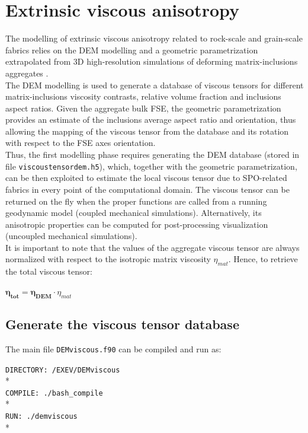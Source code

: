 \newpage

\section{Extrinsic viscous anisotropy}
The modelling of extrinsic viscous anisotropy related to rock-scale and grain-scale fabrics relies on the DEM modelling and a geometric parametrization extrapolated from 3D high-resolution simulations of deforming matrix-inclusions aggregates \citep{demontserrat2021}. \\
The DEM modelling is used to generate a database of viscous tensors for different matrix-inclusions viscosity contrasts, relative volume fraction and inclusions aspect ratios. Given the aggregate bulk FSE, the geometric parametrization provides an estimate of the inclusions average aspect ratio and orientation, thus allowing the mapping of the viscous tensor from the database and its rotation with respect to the FSE axes orientation. \\
Thus, the first modelling phase requires generating the DEM database (stored in file \texttt{viscoustensordem.h5}), which, together with the geometric parametrization, can be then exploited to estimate the local viscous tensor due to SPO-related fabrics in every point of the computational domain. The viscous tensor can be returned on the fly when the proper functions are called from a running geodynamic model (coupled mechanical simulations). Alternatively, its anisotropic properties can be computed for post-processing visualization (uncoupled mechanical simulations).\\
It is important to note that the values of the aggregate viscous tensor are always normalized with respect to the isotropic matrix viscosity $\eta_{mat}$. Hence, to retrieve the total viscous tensor:

$\pmb{\eta_{tot}}= \pmb{\eta_{DEM}}\cdot\eta_{mat}$


\subsection{Generate the viscous tensor database}
\label{section:viscousDEM}

The main file \texttt{DEMviscous.f90} can be compiled and run as:

\texttt{DIRECTORY: /EXEV/DEMviscous}\\*
\\
\texttt{COMPILE: ./bash\_compile}\\*
\\
\texttt{RUN: ./demviscous}\\*

